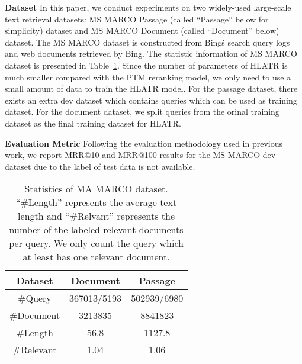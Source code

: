 \documentclass[11pt]{article}
\begin{document}
\noindent \textbf{Dataset} In this paper, we conduct experiments on two widely-used large-scale text retrieval datasets: MS MARCO Passage (called ``Passage'' below for simplicity) dataset and MS MARCO Document (called ``Document'' below) dataset. The MS MARCO dataset is constructed from Bing\'s search query logs and web documents retrieved by Bing. The statistic information of MS MARCO dataset is presented in Table~\ref{tab:static}. Since the number of parameters of HLATR is much smaller compared with the PTM reranking model, we only need to use a small amount of data to train the HLATR model. For the passage dataset, there exists an extra dev dataset which contains  queries which can be used as training dataset. For the document dataset, we split  queries from the orinal training dataset as the final training dataset for HLATR.

\vspace{0.15cm}
\noindent \textbf{Evaluation Metric} Following the evaluation methodology used in previous work, we report MRR@10 and MRR@100 results for the MS MARCO dev dataset due to the label of test data is not available. 

\begin{table}[]
\caption{Statistics of MA MARCO dataset. ``\#Length'' represents the average text length and ``\#Relvant'' represents the number of the labeled relevant documents per query. We only count the query which at least has one relevant document.}
\label{tab:static}
\begin{tabular}{@{}c|c|c@{}}
\toprule
Dataset             & Document & Passage \\ \midrule
\#Query             & 367013/5193               & 502939/6980  \\
\#Document          & 3213835                   & 8841823  \\
\#Length            & 56.8                        &  1127.8     \\
\#Relevant  & 1.04                        & 1.06       \\ \bottomrule
\end{tabular}
\end{table}
\end{document}
